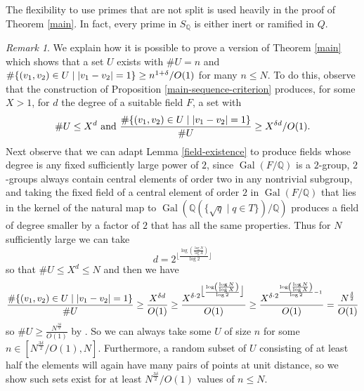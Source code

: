\documentclass[12pt]{amsart}
\newcommand{\Gal}{\operatorname{Gal}}
\theoremstyle{remark}
\newtheorem{remark}[theo]{Remark}
\theoremstyle{definition}
\begin{document}
The flexibility to use primes that are not split is used heavily in the proof of Theorem \ref{main}. In fact, every prime in $S_{\mathbb Q}$ is either inert or ramified in $Q$.




\begin{remark} We explain how it is possible to prove a version of Theorem \ref{main} which shows that a set $U$ exists with $\#U=n$ and $\# \{ (v_1,v_2) \in U \mid \abs{v_1-v_2}=1\} \geq n^{1+\delta}/O(1)$ for many $n\leq N$. To do this, observe that the construction of Proposition \ref{main-sequence-criterion} produces, for some $X > 1$, for $d$ the degree of a suitable field $F$, a set with \[\#U \leq X^d \textrm{ and } \frac{ \# \{ (v_1,v_2) \in U \mid \abs{v_1-v_2}=1\} }{\#U }\geq X^{\delta d }/O(1).\] Next observe that we can adapt Lemma \ref{field-existence} to produce fields whose degree is any fixed sufficiently large power of $2$, since $\Gal(F/\mathbb Q)$ is a $2$-group, $2$-groups always contain central elements of order two in any nontrivial subgroup, and taking the fixed field of a central element of order $2$ in  $\Gal(F/\mathbb Q)$ that lies in the kernel of the natural map to $\Gal(\mathbb Q( \{\sqrt{q} \mid q \in T\})/\mathbb Q)$ produces a field of degree smaller by a factor of $2$ that has all the same properties. Thus for $N$ sufficiently large we can take 
\[d= 2^{\bigl\lfloor \frac{ \log \left( \frac{\log N}{\log X}\right)}{\log 2} \bigr \rfloor}\] so that $\#U \leq X^d \leq N$ and then we have 
\[ \frac{\# \{ (v_1,v_2) \in U \mid \abs{v_1-v_2}=1\} }{\#U} \geq \frac{X^{\delta  d}}{O(1)} \geq  \frac{X^{\delta \cdot  2^{\bigl\lfloor \frac{ \log \left( \frac{\log N}{\log X}\right)}{\log 2} \bigr\rfloor }} }{O(1)}\geq \frac{X^{ \delta \cdot 2^{ \frac{ \log \left( \frac{\log N}{\log X}\right)}{\log 2}  -1} }}{O(1)}= \frac{N^{ \frac{\delta}{2}}}{O(1)}\]
so $\#U \geq \frac{N^{\frac{3\delta}{2}}}{O(1)}$ by \cite{Spencer1983}. So we can always take some $U$ of size $n$ for some $n \in [N^{\frac{3\delta}{2}}/O(1),N]$. Furthermore, a random subset of $U$ consisting of at least half the elements will again have many pairs of points at unit distance, so we show such sets exist for at least $N^{\frac{3\delta}{2}}/O(1)$ values of $n\leq N$.\end{remark}
\end{document}
